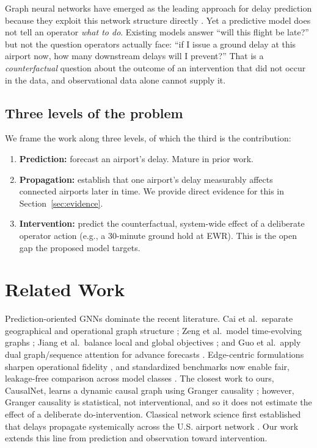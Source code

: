 \documentclass[11pt]{article}
\begin{document}
Graph neural networks have emerged as the leading approach for delay prediction
because they exploit this network structure directly
\cite{cai2023, zeng2021, jiang2022, guo2020}. Yet a predictive model does not
tell an operator \emph{what to do}. Existing models answer ``will this flight be
late?'' but not the question operators actually face: ``if I issue a ground delay
at this airport now, how many downstream delays will I prevent?'' That is a
\emph{counterfactual} question about the outcome of an intervention that did not
occur in the data, and observational data alone cannot supply it.

\subsection{Three levels of the problem}
We frame the work along three levels, of which the third is the contribution:
\begin{enumerate}
  \item \textbf{Prediction:} forecast an airport's delay. Mature in prior work.
  \item \textbf{Propagation:} establish that one airport's delay measurably
        affects connected airports later in time. We provide direct evidence for
        this in Section~\ref{sec:evidence}.
  \item \textbf{Intervention:} predict the counterfactual, system-wide effect of
        a deliberate operator action (e.g., a 30-minute ground hold at EWR).
        This is the open gap the proposed model targets.
\end{enumerate}

\section{Related Work}
Prediction-oriented GNNs dominate the recent literature. Cai et al.\ separate
geographical and operational graph structure \cite{cai2023}; Zeng et al.\ model
time-evolving graphs \cite{zeng2021}; Jiang et al.\ balance local and global
objectives \cite{jiang2022}; and Guo et al.\ apply dual graph/sequence attention
for advance forecasts \cite{guo2020}. Edge-centric formulations sharpen
operational fidelity \cite{tang2026, franco2026}, and standardized benchmarks now
enable fair, leakage-free comparison across model classes \cite{xu2025}. The
closest work to ours, CausalNet, learns a dynamic causal graph using Granger
causality \cite{zhu2024}; however, Granger causality is statistical, not
interventional, and so it does not estimate the effect of a deliberate
do-intervention. Classical network science first established that delays
propagate systemically across the U.S. airport network \cite{fleurquin2013}.
Our work extends this line from prediction and observation toward intervention.
\end{document}
